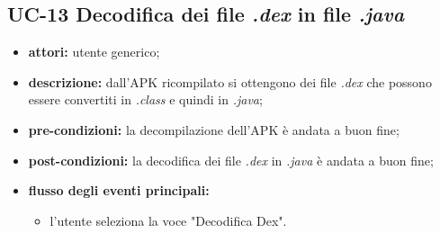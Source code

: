 \subsection*{UC-13 Decodifica dei file \textit{.dex} in file \textit{.java}}\label{subsec:uc-13-decodifica-dei-filetextitin-filetextit}
\begin{itemize}
    \item \textbf{attori:} utente generico;
    \item \textbf{descrizione:} dall'APK ricompilato si ottengono dei file \textit{.dex} che possono essere convertiti in \textit{.class} e quindi in \textit{.java};
    \item \textbf{pre-condizioni:} la decompilazione dell'APK \`{e} andata a buon fine;
    \item \textbf{post-condizioni:} la decodifica dei file \textit{.dex} in \textit{.java} \`{e} andata a buon fine;
    \item \textbf{flusso degli eventi principali:}
    \begin{itemize}
        \item l'utente seleziona la voce "Decodifica Dex".
    \end{itemize}
\end{itemize}

